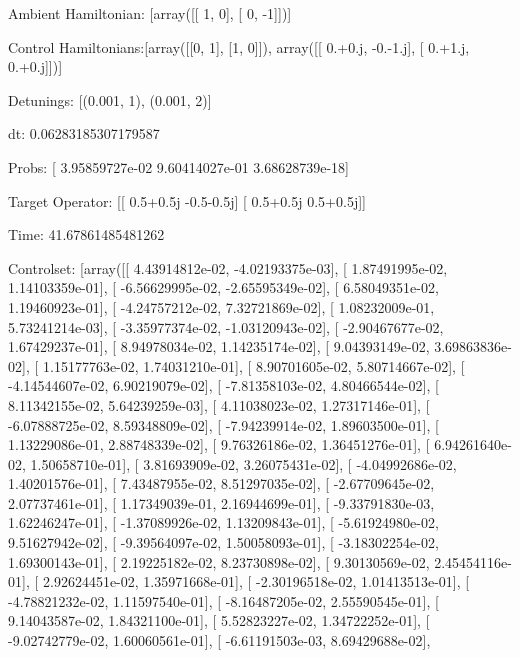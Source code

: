 \documentclass{article}
\begin{document}
    

\newpage

Ambient Hamiltonian: [array([[ 1,  0],
       [ 0, -1]])]

Control Hamiltonians:[array([[0, 1],
       [1, 0]]), array([[ 0.+0.j, -0.-1.j],
       [ 0.+1.j,  0.+0.j]])]

Detunings: [(0.001, 1), (0.001, 2)]

 dt: 0.06283185307179587

Probs: [  3.95859727e-02   9.60414027e-01   3.68628739e-18]

Target Operator: [[ 0.5+0.5j -0.5-0.5j]
 [ 0.5+0.5j  0.5+0.5j]]

Time: 41.67861485481262

Controlset: [array([[  4.43914812e-02,  -4.02193375e-03],
       [  1.87491995e-02,   1.14103359e-01],
       [ -6.56629995e-02,  -2.65595349e-02],
       [  6.58049351e-02,   1.19460923e-01],
       [ -4.24757212e-02,   7.32721869e-02],
       [  1.08232009e-01,   5.73241214e-03],
       [ -3.35977374e-02,  -1.03120943e-02],
       [ -2.90467677e-02,   1.67429237e-01],
       [  8.94978034e-02,   1.14235174e-02],
       [  9.04393149e-02,   3.69863836e-02],
       [  1.15177763e-02,   1.74031210e-01],
       [  8.90701605e-02,   5.80714667e-02],
       [ -4.14544607e-02,   6.90219079e-02],
       [ -7.81358103e-02,   4.80466544e-02],
       [  8.11342155e-02,   5.64239259e-03],
       [  4.11038023e-02,   1.27317146e-01],
       [ -6.07888725e-02,   8.59348809e-02],
       [ -7.94239914e-02,   1.89603500e-01],
       [  1.13229086e-01,   2.88748339e-02],
       [  9.76326186e-02,   1.36451276e-01],
       [  6.94261640e-02,   1.50658710e-01],
       [  3.81693909e-02,   3.26075431e-02],
       [ -4.04992686e-02,   1.40201576e-01],
       [  7.43487955e-02,   8.51297035e-02],
       [ -2.67709645e-02,   2.07737461e-01],
       [  1.17349039e-01,   2.16944699e-01],
       [ -9.33791830e-03,   1.62246247e-01],
       [ -1.37089926e-02,   1.13209843e-01],
       [ -5.61924980e-02,   9.51627942e-02],
       [ -9.39564097e-02,   1.50058093e-01],
       [ -3.18302254e-02,   1.69300143e-01],
       [  2.19225182e-02,   8.23730898e-02],
       [  9.30130569e-02,   2.45454116e-01],
       [  2.92624451e-02,   1.35971668e-01],
       [ -2.30196518e-02,   1.01413513e-01],
       [ -4.78821232e-02,   1.11597540e-01],
       [ -8.16487205e-02,   2.55590545e-01],
       [  9.14043587e-02,   1.84321100e-01],
       [  5.52823227e-02,   1.34722252e-01],
       [ -9.02742779e-02,   1.60060561e-01],
       [ -6.61191503e-03,   8.69429688e-02],
\end{document}

